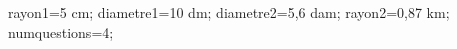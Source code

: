 \documentclass[exercice]{thedocument}%
\begin{document}
%
    \>rayon1=5 cm;%
    \>diametre1=10 dm;%
    \>diametre2=5,6 dam;%
    \>rayon2=0,87 km;%
    \>numquestions=4;%
\end{document}
